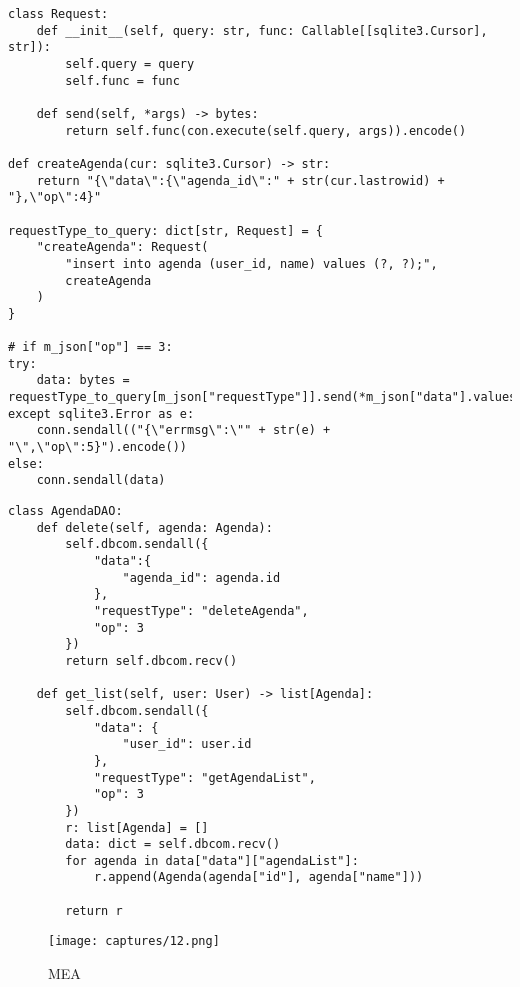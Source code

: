 \documentclass[11pt]{beamer}
\begin{document}
\begin{lstlisting}
class Request:
    def __init__(self, query: str, func: Callable[[sqlite3.Cursor], str]):
        self.query = query
        self.func = func

    def send(self, *args) -> bytes:
        return self.func(con.execute(self.query, args)).encode()

def createAgenda(cur: sqlite3.Cursor) -> str:
    return "{\"data\":{\"agenda_id\":" + str(cur.lastrowid) + "},\"op\":4}"

requestType_to_query: dict[str, Request] = {
    "createAgenda": Request(
        "insert into agenda (user_id, name) values (?, ?);",
        createAgenda
    )
}

# if m_json["op"] == 3:
try:
    data: bytes = requestType_to_query[m_json["requestType"]].send(*m_json["data"].values())
except sqlite3.Error as e:
    conn.sendall(("{\"errmsg\":\"" + str(e) + "\",\"op\":5}").encode())
else:
    conn.sendall(data)
\end{lstlisting}

\newpage
\begin{lstlisting}
class AgendaDAO:
    def delete(self, agenda: Agenda):
        self.dbcom.sendall({
            "data":{
                "agenda_id": agenda.id
            },
            "requestType": "deleteAgenda",
            "op": 3
        })
        return self.dbcom.recv()
    
    def get_list(self, user: User) -> list[Agenda]:
        self.dbcom.sendall({
            "data": {
                "user_id": user.id
            },
            "requestType": "getAgendaList",
            "op": 3
        })
        r: list[Agenda] = []
        data: dict = self.dbcom.recv()
        for agenda in data["data"]["agendaList"]:
            r.append(Agenda(agenda["id"], agenda["name"]))

        return r
\end{lstlisting}

\begin{frame}
    \begin{figure}[H]
        \centering
            \texttt{[image: captures/12.png]}
            \caption{MEA}
    \end{figure}
\end{frame}
\end{document}
